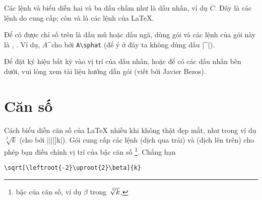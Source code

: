 \medskip
Các lệnh  và  biểu diễn hai và ba dấu chấm
như là dấu nhấn, ví dụ $\dddot C$. Đây là các lệnh do  cung cấp;
còn  và  là các lệnh của \LaTeX{}.

\medskip
Để có được chỉ số trên là dấu mũ hoặc dấu ngã, dùng gói 
và các lệnh của gói này là , . Ví dụ,
$A\sphat$\space\space cho bởi \verb'A\sphat' (để ý ở đây ta không dùng dấu |^|).

\medskip
Để đặt ký hiệu bất kỳ vào vị trí của dấu nhấn, hoặc để có các dấu nhấn
bên dưới, vui lòng xem tài liệu hướng dẫn gói (viết bởi Javier Bezos).

\section{Căn số}

Cách biểu diễn căn số của \LaTeX{} nhiều khi không thật đẹp mắt, như
trong ví dụ $\sqrt[\beta]{k}$ (cho bởi |\sqrt||[\beta]{k}|). 
Gói  cung cấp các lệnh  (dịch qua trái) và 
(dịch lên trên)
cho phép bạn điều chỉnh vị trí của bậc căn số%
\footnote{bậc của căn số, ví dụ $\beta$ trong $\sqrt[\leftroot{-2}\uproot{2}\beta]{k}$.}.
Chẳng hạn

\medskip
\begin{verbatim}
\sqrt[\leftroot{-2}\uproot{2}\beta]{k}
\end{verbatim}

